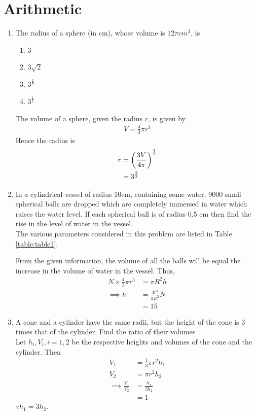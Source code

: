 \documentclass[journal,12pt,twocolumn]{IEEEtran}
\begin{document}
\section{Arithmetic}
\begin{enumerate}
\item The radius of a sphere (in cm), whose volume is $12\pi cm^3$, is
\begin{enumerate}
    \item $3$
    \item $3 \sqrt{2}$
    \item $3^\frac{2}{3}$
    \item $3^\frac{1}{3}$
\end{enumerate}
\solution 
The volume of a sphere, given the radius $r$, is given by
\begin{align}
	V = \frac{4}{3}\pi r^3
\end{align}
Hence the radius is 
\begin{align}
	r &= \left(\frac{3V}{4\pi}\right)^{\frac{1}{3}}  
	\\
	 &= 3^{\frac{2}{3}}  
\end{align}

    \item In a cylindrical vessel of radius 10cm, containing some water, 9000 small spherical balls are dropped which are completely immersed in water which raises the water level. If each spherical ball is of radius 0.5 cm then find the rise in the level of water in the vessel.\\
	    \solution The various parameters considered in this problem are listed in Table 
\eqref{table:table1}. 

\begin{table}[ht!]
	
\caption{}
\label{table:table1}	
\end{table}
From the given information, the volume of all the balls will be equal the increase in the volume of water in the vessel.  Thus, 
\begin{align}
	N \times \frac{4}{3}\pi r^3 &= \pi R^2 h
	\\
	\implies  h &=  \frac{4r^3}{3R^2}N
	\\
	&= 15
\end{align}
    \item A cone and a cylinder have the same radii, but the height of the cone is 3 times that of the cylinder. Find the ratio of their volumes\\
   \solution Let $h_i, V_i, i = 1,2$ be the respective heights and volumes of the cone and the cylinder. 
   Then 
  \begin{align}
	  V_1 &= \frac{1}{3} \pi r^2 h_1
	  \\
	  V_2 &=  \pi r^2 h_2
	  \\
	  \implies \frac{V_1}{V_2} &= \frac{h_1}{3h_2}
	  \\
	  &= 1
  \end{align}
  $\because h_1 = 3h_2$.

\end{enumerate}
\end{document}
